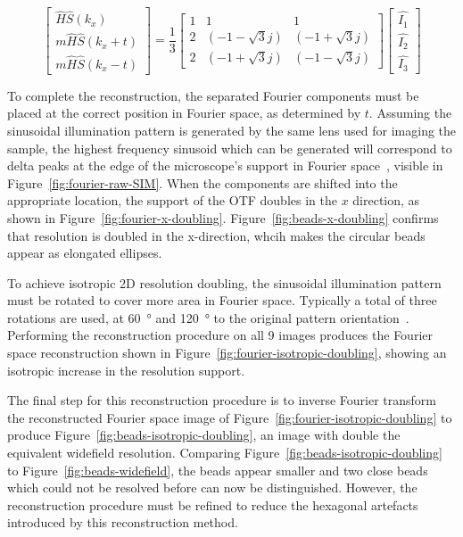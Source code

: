 \begin{equation} \label{eq:matrix-solved}
\begin{bmatrix} \hat{H}\hat{S}\left(k_x\right) \\ m\hat{H}\hat{S}\left(k_x+t\right) \\ m\hat{H}\hat{S}\left(k_x-t\right) \end{bmatrix} = 
\frac{1}{3} \begin{bmatrix}
1 & 1 & 1 \\ 
2 & \left(-1 -\sqrt{3}j\right) & \left(-1+\sqrt{3}j\right) \\ 
2 & \left(-1 +\sqrt{3}j\right) & \left(-1 -\sqrt{3}j\right)
\end{bmatrix}
\begin{bmatrix} \hat{I_1} \\ \hat{I_2} \\ \hat{I_3} \end{bmatrix}
\end{equation}

To complete the reconstruction, the separated Fourier components must be placed at the correct position in Fourier space, as determined by $t$. 
Assuming the sinusoidal illumination pattern is generated by the same lens used for imaging the sample, the highest frequency sinusoid which can be generated will correspond to delta peaks at the edge of the microscope's support in Fourier space~\cite{heintzmann2017super}, visible in Figure~\ref{fig:fourier-raw-SIM}. 
When the components are shifted into the appropriate location, the support of the OTF doubles in the $x$ direction, as shown in Figure~\ref{fig:fourier-x-doubling}. 
Figure~\ref{fig:beads-x-doubling} confirms that resolution is doubled in the x-direction, whcih makes the circular beads appear as elongated ellipses. 

To achieve isotropic 2D resolution doubling, the sinusoidal illumination pattern must be rotated to cover more area in Fourier space. 
Typically a total of three rotations are used, at \SI{60}{\degree} and \SI{120}{\degree} to the original pattern orientation~\cite{gustafsson2000surpassing, chang2009isotropic}. 
Performing the reconstruction procedure on all 9 images produces the Fourier space reconstruction shown in Figure~\ref{fig:fourier-isotropic-doubling}, showing an isotropic increase in the resolution support. 


The final step for this reconstruction procedure is to inverse Fourier transform the reconstructed Fourier space image of Figure~\ref{fig:fourier-isotropic-doubling} to produce Figure~\ref{fig:beads-isotropic-doubling}, an image with double the equivalent widefield resolution. 
Comparing Figure~\ref{fig:beads-isotropic-doubling} to Figure~\ref{fig:beads-widefield}, the beads appear smaller and two close beads which could not be resolved before can now be distinguished. 
However, the reconstruction procedure must be refined to reduce the hexagonal artefacts introduced by this reconstruction method. 


